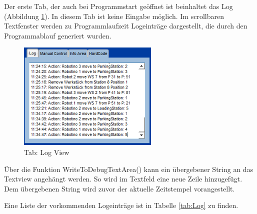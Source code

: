 Der erste Tab, der auch bei Programmstart geöffnet ist beinhaltet das Log (Abbildung \ref{fig:Log}). In diesem Tab ist keine Eingabe möglich. Im scrollbaren Textfenster werden zu Programmlaufzeit Logeinträge dargestellt, die durch den Programmablauf generiert wurden. 

\begin{figure}[htb]
    \centering
    \includegraphics[width=0.6\textwidth]{Abbildungen/Log.png}
    \caption{Tab: Log View}		
    \label{fig:Log}
\end{figure}

Über die Funktion WriteToDebugTextArea() kann ein übergebener String an das Textview angehängt werden. So wird im Textfeld eine neue Zeile hinzugefügt. Dem übergebenen String wird zuvor der aktuelle Zeitstempel vorangestellt. 

Eine Liste der vorkommenden Logeinträge ist in Tabelle \ref{tab:Log} zu finden. 

